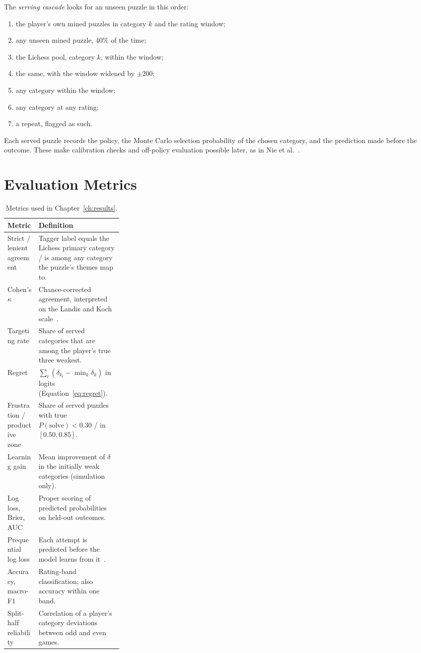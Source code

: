 The \emph{serving cascade} looks for an unseen puzzle in this order:
\begin{enumerate}
  \item the player's own mined puzzles in category $k$ and the rating window;
  \item any unseen mined puzzle, 40\% of the time;
  \item the Lichess pool, category $k$, within the window;
  \item the same, with the window widened by $\pm 200$;
  \item any category within the window;
  \item any category at any rating;
  \item a repeat, flagged as such.
\end{enumerate}
Each served puzzle records the policy, the Monte Carlo selection probability of the chosen category,
and the prediction made before the outcome. These make calibration checks and off-policy evaluation
possible later, as in Nie et al.~\cite{nie2026discovering}.

\section{Evaluation Metrics}\label{sec:metrics}

\begin{table}[H]
\centering
\small
\caption{Metrics used in Chapter~\ref{ch:results}.}\label{tab:metrics}
\begin{tabularx}{\linewidth}{p{0.27\linewidth}Y}
\toprule
\textbf{Metric} & \textbf{Definition} \\
\midrule
Strict / lenient agreement & Tagger label equals the Lichess primary category / is among any category the puzzle's themes map to. \\
Cohen's $\kappa$ & Chance-corrected agreement, interpreted on the Landis and Koch scale~\cite{landis1977measurement}. \\
Targeting rate & Share of served categories that are among the player's true three weakest. \\
Regret & $\sum_t (\delta_{k_t} - \min_k \delta_k)$ in logits (Equation~\eqref{eq:regret}). \\
Frustration / productive zone & Share of served puzzles with true $P(\text{solve})<0.30$ / in $[0.50, 0.85]$. \\
Learning gain & Mean improvement of $\delta$ in the initially weak categories (simulation only). \\
Log loss, Brier, AUC & Proper scoring of predicted probabilities on held-out outcomes. \\
Prequential log loss & Each attempt is predicted before the model learns from it~\cite{dawid1984present}. \\
Accuracy, macro-F1 & Rating-band classification; also accuracy within one band. \\
Split-half reliability & Correlation of a player's category deviations between odd and even games. \\
\bottomrule
\end{tabularx}
\end{table}

